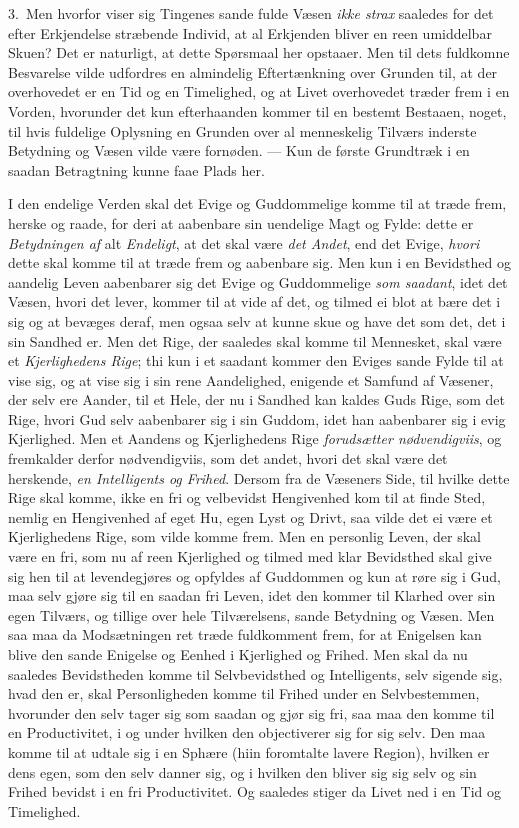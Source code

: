 \documentclass[12pt,a4paper]{book}
\newcommand{\apage}[1]{\marginnote{\footnotesize\textit{[#1]}}}
\begin{document}
3.~Men hvorfor viser sig Tingenes sande fulde Væsen \emph{ikke strax} saaledes for det
efter Erkjendelse stræbende Individ, at al Erkjenden bliver en reen umiddelbar
Skuen? Det er naturligt, at dette Spørsmaal her opstaaer. Men til dets
fuldkomne Besvarelse vilde udfordres en almindelig \apage{33}  Eftertænkning over Grunden
til, at der overhovedet er en Tid og en Timelighed, og at Livet overhovedet
træder frem i en Vorden, hvorunder det kun efterhaanden kommer til en bestemt
Bestaaen, noget, til hvis fuldelige Oplysning en Grunden over al menneskelig
Tilværs inderste Betydning og Væsen vilde være fornøden. --- Kun de første
Grundtræk i en saadan Betragtning kunne faae Plads her.

I den endelige Verden skal det Evige og Guddommelige komme til at træde frem,
herske og raade, for deri at aabenbare sin uendelige Magt og Fylde: dette er
\emph{Betydningen af} alt \emph{Endeligt}, at det skal være \emph{det Andet}, end det Evige,
\emph{hvori} dette skal komme til at træde frem og aabenbare sig. Men kun i en
Bevidsthed og aandelig Leven aabenbarer sig det Evige og Guddommelige \emph{som
saadant}, idet det Væsen, hvori det lever, kommer til at vide af det, og tilmed
ei blot at bære det i sig og at bevæges deraf, men ogsaa selv at kunne skue og
have det som det, det i sin Sandhed er. Men det Rige, der saaledes skal komme
til Mennesket, skal være et \emph{Kjerlighedens Rige}; thi kun i et saadant
kommer den Eviges sande Fylde til at vise sig, og at vise sig i sin rene
Aandelighed, enigende et Samfund af Væsener, der selv ere Aander, til et Hele,
der nu i Sandhed kan kaldes Guds Rige, \apage{34} som det Rige, hvori Gud selv aabenbarer
sig i sin Guddom, idet han aabenbarer sig i evig Kjerlighed. Men et Aandens og
Kjerlighedens Rige \emph{forudsætter nødvendigviis}, og fremkalder derfor
nødvendigviis, som det andet, hvori det skal være det herskende, \emph{en
Intelligents og Frihed}. Dersom fra de Væseners Side, til hvilke dette Rige skal
komme, ikke en fri og velbevidst Hengivenhed kom til at finde Sted, nemlig en
Hengivenhed af eget Hu, egen Lyst og Drivt, saa vilde det ei være et
Kjerlighedens Rige, som vilde komme frem. Men en personlig Leven, der skal være
en fri, som nu af reen Kjerlighed og tilmed med klar Bevidsthed skal give sig
hen til at levendegjøres og opfyldes af Guddommen og kun at røre sig i Gud, maa
selv gjøre sig til en saadan fri Leven, idet den kommer til Klarhed over sin egen
Tilværs, og tillige over hele Tilværelsens, sande Betydning og Væsen. Men saa
maa da Modsætningen ret træde fuldkomment frem, for at Enigelsen kan blive den
sande Enigelse og Eenhed i Kjerlighed og Frihed. Men skal da nu saaledes
Bevidstheden komme til Selvbevidsthed og Intelligents, selv sigende sig, hvad
den er, skal Personligheden komme til Frihed under en Selvbestemmen, hvorunder
den selv tager sig som saadan og gjør sig fri, saa maa den komme til en
Productivitet, i og under hvilken den objectiverer sig for sig selv. Den maa
komme til at udtale sig \apage{35} i en Sphære (hiin foromtalte lavere Region), hvilken er
dens egen, som den selv danner sig, og i hvilken den bliver sig sig selv og sin
Frihed bevidst i en fri Productivitet. Og saaledes stiger da Livet ned i en Tid
og Timelighed.
\end{document}
